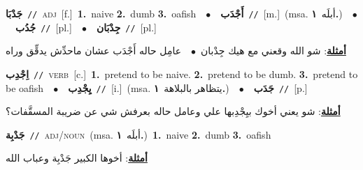 \documentclass[10pt,a4paper,twoside]{article} %
\begin{document}
\begin{multicols}{2}
{{{{{{{{{{{\setlength\topsep{0pt}\textbf{\foreignlanguage{arabic}{جَدْبَا}}\ {\color{gray}\texttt{//}\color{black}}\ \textsc{adj}\ [f.]\ \textbf{1.}~naive  \textbf{2.}~dumb  \textbf{3.}~oafish\ \ $\bullet$\ \ \setlength\topsep{0pt}\textbf{\foreignlanguage{arabic}{أَجْدَب}}\ {\color{gray}\texttt{//}\color{black}}\ [m.]\ \color{gray}(msa. \foreignlanguage{arabic}{أبلَه}~\foreignlanguage{arabic}{\textbf{١.}})\color{black}\ \ $\bullet$\ \ \setlength\topsep{0pt}\textbf{\foreignlanguage{arabic}{جُدُب}}\ {\color{gray}\texttt{//}\color{black}}\ [pl.]\ \ $\bullet$\ \ \setlength\topsep{0pt}\textbf{\foreignlanguage{arabic}{جِدْبَان}}\ {\color{gray}\texttt{//}\color{black}}\ [pl.]\  \begin{flushright}\color{gray}\foreignlanguage{arabic}{\textbf{\underline{\foreignlanguage{arabic}{أمثلة}}}: شو الله وقعني مع هيك جِدْبان\ $\bullet$\ \  عامِل حاله أَجْدَب عشان ماحدِّش يدقِّق وراه}\end{flushright}\color{black}} \vspace{2mm}

{\setlength\topsep{0pt}\textbf{\foreignlanguage{arabic}{اِجْدِب}}\ {\color{gray}\texttt{//}\color{black}}\ \textsc{verb}\ [c.]\ \textbf{1.}~pretend to be naive.  \textbf{2.}~pretend to be dumb.  \textbf{3.}~pretend to be oafish\ \ $\bullet$\ \ \setlength\topsep{0pt}\textbf{\foreignlanguage{arabic}{يِجْدِب}}\ {\color{gray}\texttt{//}\color{black}}\ [i.]\ \color{gray}(msa. \foreignlanguage{arabic}{يتظاهر بالبلاهة}~\foreignlanguage{arabic}{\textbf{١.}})\color{black}\ \ $\bullet$\ \ \setlength\topsep{0pt}\textbf{\foreignlanguage{arabic}{جَدَب}}\ {\color{gray}\texttt{//}\color{black}}\ [p.]\  \begin{flushright}\color{gray}\foreignlanguage{arabic}{\textbf{\underline{\foreignlanguage{arabic}{أمثلة}}}: شو يعني أخوك بيِجْدِبها علي وعامل حاله بعرفش شي عن ضريبة المسقَّفات؟}\end{flushright}\color{black}} \vspace{2mm}

{\setlength\topsep{0pt}\textbf{\foreignlanguage{arabic}{جَدْبِة}}\ {\color{gray}\texttt{//}\color{black}}\ \textsc{adj/noun}\ \color{gray}(msa. \foreignlanguage{arabic}{أبلَه}~\foreignlanguage{arabic}{\textbf{١.}})\color{black}\ \textbf{1.}~naive  \textbf{2.}~dumb  \textbf{3.}~oafish\  \begin{flushright}\color{gray}\foreignlanguage{arabic}{\textbf{\underline{\foreignlanguage{arabic}{أمثلة}}}: أخوها الكبير جَدْبِة وعباب الله}\end{flushright}\color{black}} \vspace{2mm}

}}}}}}}}}}
\end{multicols}
\end{document}
